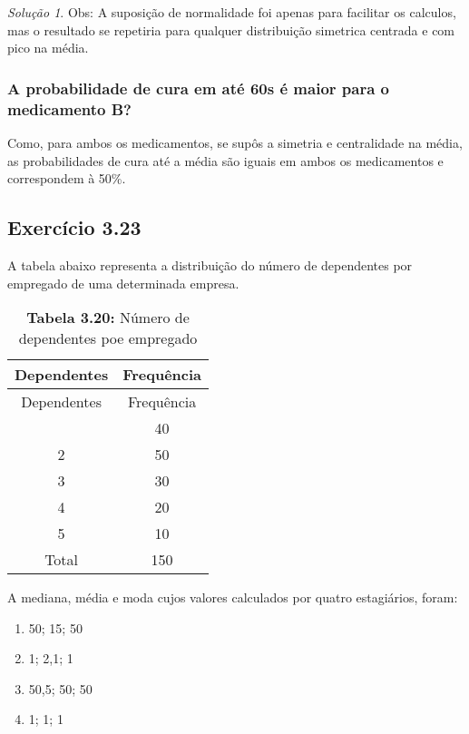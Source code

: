 \documentclass[
]{latex/krantz}
\providecommand{\tightlist}{%
  \setlength{\itemsep}{0pt}\setlength{\parskip}{0pt}}
\theoremstyle{definition}
\theoremstyle{definition}
\theoremstyle{definition}
\theoremstyle{definition}
\theoremstyle{remark}
\newtheorem*{solution}{Solução}
\begin{document}
\begin{solution}
Obs: A suposição de normalidade foi apenas para facilitar os calculos, mas o resultado se repetiria para qualquer distribuição simetrica centrada e com pico na média.

\hypertarget{a-probabilidade-de-cura-em-atuxe9-60s-uxe9-maior-para-o-medicamento-b}{%
\subsubsection*{A probabilidade de cura em até 60s é maior para o medicamento B?}\label{a-probabilidade-de-cura-em-atuxe9-60s-uxe9-maior-para-o-medicamento-b}}

Como, para ambos os medicamentos, se supôs a simetria e centralidade na média, as probabilidades de cura até a média são iguais em ambos os medicamentos e correspondem à 50\%.

\end{solution}

\hypertarget{exr3-23}{%
\subsection*{Exercício 3.23}\label{exr3-23}}

A tabela abaixo representa a distribuição do número de dependentes por empregado de uma determinada empresa.

\begin{longtable}[]{@{}cc@{}}
\caption{\textbf{Tabela 3.20:} Número de dependentes poe empregado}\tabularnewline
\toprule\noalign{}
Dependentes & Frequência \\
\midrule\noalign{}
\endfirsthead
\toprule\noalign{}
Dependentes & Frequência \\
\midrule\noalign{}
\endhead
\bottomrule\noalign{}
\endlastfoot
1 & 40 \\
2 & 50 \\
3 & 30 \\
4 & 20 \\
5 & 10 \\
Total & 150 \\
\end{longtable}

A mediana, média e moda cujos valores calculados por quatro estagiários, foram:

\begin{enumerate}
\def\labelenumi{\alph{enumi})}
\tightlist
\item
  50; 15; 50
\item
  1; 2,1; 1
\item
  50,5; 50; 50
\item
  1; 1; 1
\end{enumerate}
\end{document}
